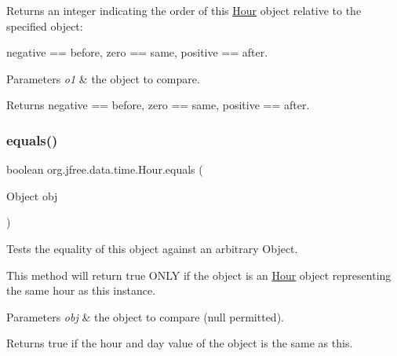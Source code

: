 Returns an integer indicating the order of this \mbox{\hyperlink{classorg_1_1jfree_1_1data_1_1time_1_1_hour}{Hour}} object relative to the specified object\+:

negative == before, zero == same, positive == after.


\begin{DoxyParams}{Parameters}
{\em o1} & the object to compare.\\
\hline
\end{DoxyParams}
\begin{DoxyReturn}{Returns}
negative == before, zero == same, positive == after. 
\end{DoxyReturn}
\mbox{\label{classorg_1_1jfree_1_1data_1_1time_1_1_hour_a388891cb2789a753133fe9c0fd320025}} 
\subsubsection{\texorpdfstring{equals()}{equals()}}
{\footnotesize\ttfamily boolean org.\+jfree.\+data.\+time.\+Hour.\+equals (\begin{DoxyParamCaption}\item[{Object}]{obj }\end{DoxyParamCaption})}

Tests the equality of this object against an arbitrary Object. 

This method will return true O\+N\+LY if the object is an \mbox{\hyperlink{classorg_1_1jfree_1_1data_1_1time_1_1_hour}{Hour}} object representing the same hour as this instance.


\begin{DoxyParams}{Parameters}
{\em obj} & the object to compare ({\ttfamily null} permitted).\\
\hline
\end{DoxyParams}
\begin{DoxyReturn}{Returns}
{\ttfamily true} if the hour and day value of the object is the same as this. 
\end{DoxyReturn}
\mbox{\label{classorg_1_1jfree_1_1data_1_1time_1_1_hour_a064771929fee2fefb995e61c2d0992c3}} 
